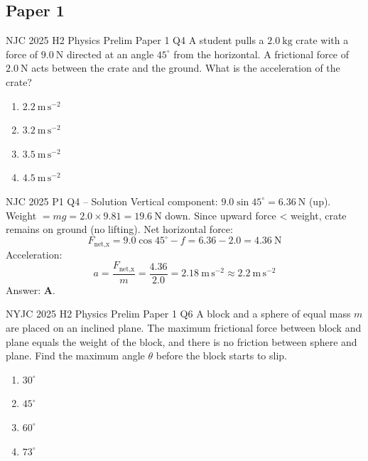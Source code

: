 \documentclass[11pt]{beamer}
\begin{document}
\subsection{Paper 1}

\begin{frame}[shrink=20]{NJC 2025 H2 Physics Prelim Paper 1 Q4}
A student pulls a $2.0\ \mathrm{kg}$ crate with a force of $9.0\ \mathrm{N}$ directed at an angle $45^\circ$ from the horizontal. A frictional force of $2.0\ \mathrm{N}$ acts between the crate and the ground.
What is the acceleration of the crate?
\begin{enumerate}[A]
    \item $2.2\ \mathrm{m\,s^{-2}}$
    \item $3.2\ \mathrm{m\,s^{-2}}$
    \item $3.5\ \mathrm{m\,s^{-2}}$
    \item $4.5\ \mathrm{m\,s^{-2}}$
\end{enumerate}
\end{frame}

\begin{frame}{NJC 2025 P1 Q4 – Solution}
Vertical component: $9.0\sin45^\circ = 6.36\ \mathrm{N}$ (up). Weight $= mg = 2.0\times9.81 = 19.6\ \mathrm{N}$ down. Since upward force < weight, crate remains on ground (no lifting). Net horizontal force:
\[ F_{\text{net,x}} = 9.0\cos45^\circ - f = 6.36 - 2.0 = 4.36\ \mathrm{N} \]
Acceleration:
\[ a = \frac{F_{\text{net,x}}}{m} = \frac{4.36}{2.0} = 2.18\ \mathrm{m\,s^{-2}} \approx 2.2\ \mathrm{m\,s^{-2}} \]
Answer: \textbf{A}.
\end{frame}

\begin{frame}[shrink=20]{NYJC 2025 H2 Physics Prelim Paper 1 Q6}
A block and a sphere of equal mass $m$ are placed on an inclined plane. The maximum frictional force between block and plane equals the weight of the block, and there is no friction between sphere and plane. Find the maximum angle $\theta$ before the block starts to slip.
\begin{enumerate}[A]
    \item $30^\circ$
    \item $45^\circ$
    \item $60^\circ$
    \item $73^\circ$
\end{enumerate}
\end{frame}
\end{document}
